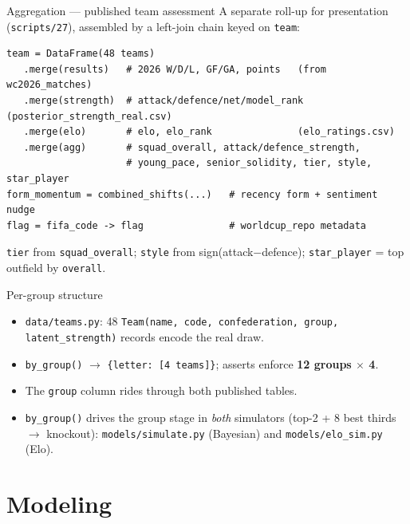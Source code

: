 \documentclass[aspectratio=169]{beamer}
\begin{document}
\begin{frame}[fragile]{Aggregation --- published team assessment}
A separate roll-up for presentation (\texttt{scripts/27}), assembled by a
left-join chain keyed on \texttt{team}:
\begin{lstlisting}
team = DataFrame(48 teams)
   .merge(results)   # 2026 W/D/L, GF/GA, points   (from wc2026_matches)
   .merge(strength)  # attack/defence/net/model_rank (posterior_strength_real.csv)
   .merge(elo)       # elo, elo_rank               (elo_ratings.csv)
   .merge(agg)       # squad_overall, attack/defence_strength,
                     # young_pace, senior_solidity, tier, style, star_player
form_momentum = combined_shifts(...)   # recency form + sentiment nudge
flag = fifa_code -> flag               # worldcup_repo metadata
\end{lstlisting}
\footnotesize \texttt{tier} from \texttt{squad\_overall}; \texttt{style} from
sign(attack$-$defence); \texttt{star\_player} = top outfield by \texttt{overall}.
\end{frame}

\begin{frame}{Per-group structure}
\begin{itemize}
  \item \texttt{data/teams.py}: 48 \texttt{Team(name, code, confederation,
        group, latent\_strength)} records encode the real draw.
  \item \texttt{by\_group()} $\to$ \texttt{\{letter: [4 teams]\}}; asserts
        enforce \textbf{12 groups $\times$ 4}.
  \item The \texttt{group} column rides through both published tables.
  \item \texttt{by\_group()} drives the group stage in \emph{both} simulators
        (top-2 + 8 best thirds $\to$ knockout): \texttt{models/simulate.py}
        (Bayesian) and \texttt{models/elo\_sim.py} (Elo).
\end{itemize}
\end{frame}

\section{Modeling}
\end{document}
